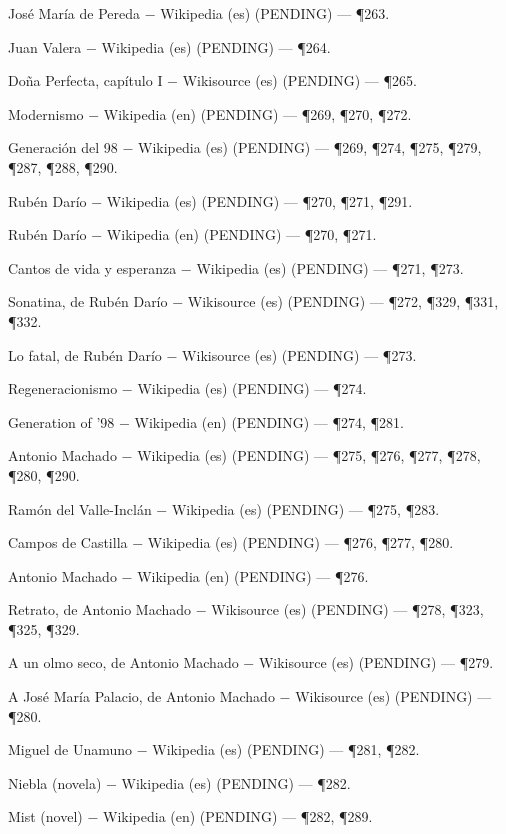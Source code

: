 \documentclass{book}
\begin{document}
\noindent José María de Pereda \(-\) Wikipedia (es) (PENDING) --- \P263.

\noindent Juan Valera \(-\) Wikipedia (es) (PENDING) --- \P264.

\noindent Doña Perfecta, capítulo I \(-\) Wikisource (es) (PENDING) --- \P265.

\noindent Modernismo \(-\) Wikipedia (en) (PENDING) --- \P269, \P270, \P272.

\noindent Generación del 98 \(-\) Wikipedia (es) (PENDING) --- \P269, \P274, \P275, \P279, \P287, \P288, \P290.

\noindent Rubén Darío \(-\) Wikipedia (es) (PENDING) --- \P270, \P271, \P291.

\noindent Rubén Darío \(-\) Wikipedia (en) (PENDING) --- \P270, \P271.

\noindent Cantos de vida y esperanza \(-\) Wikipedia (es) (PENDING) --- \P271, \P273.

\noindent Sonatina, de Rubén Darío \(-\) Wikisource (es) (PENDING) --- \P272, \P329, \P331, \P332.

\noindent Lo fatal, de Rubén Darío \(-\) Wikisource (es) (PENDING) --- \P273.

\noindent Regeneracionismo \(-\) Wikipedia (es) (PENDING) --- \P274.

\noindent Generation of '98 \(-\) Wikipedia (en) (PENDING) --- \P274, \P281.

\noindent Antonio Machado \(-\) Wikipedia (es) (PENDING) --- \P275, \P276, \P277, \P278, \P280, \P290.

\noindent Ramón del Valle-Inclán \(-\) Wikipedia (es) (PENDING) --- \P275, \P283.

\noindent Campos de Castilla \(-\) Wikipedia (es) (PENDING) --- \P276, \P277, \P280.

\noindent Antonio Machado \(-\) Wikipedia (en) (PENDING) --- \P276.

\noindent Retrato, de Antonio Machado \(-\) Wikisource (es) (PENDING) --- \P278, \P323, \P325, \P329.

\noindent A un olmo seco, de Antonio Machado \(-\) Wikisource (es) (PENDING) --- \P279.

\noindent A José María Palacio, de Antonio Machado \(-\) Wikisource (es) (PENDING) --- \P280.

\noindent Miguel de Unamuno \(-\) Wikipedia (es) (PENDING) --- \P281, \P282.

\noindent Niebla (novela) \(-\) Wikipedia (es) (PENDING) --- \P282.

\noindent Mist (novel) \(-\) Wikipedia (en) (PENDING) --- \P282, \P289.
\end{document}
